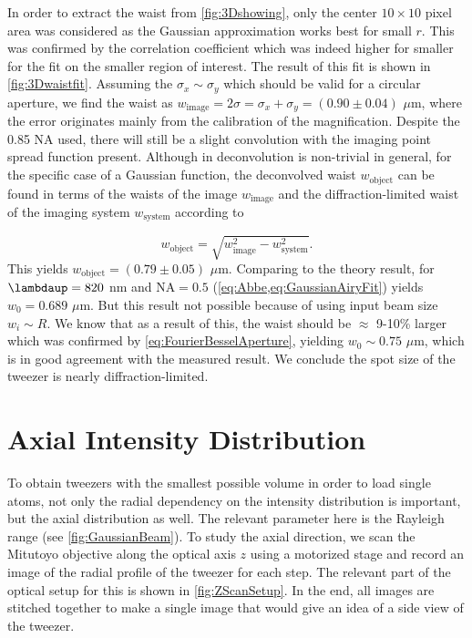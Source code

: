 In order to extract the waist from \cref{fig:3Dshowing}, only the center $10 \times 10$ pixel area was considered as the Gaussian approximation works best for small $r$. 
This was confirmed by the correlation coefficient which was indeed higher for smaller for the fit on the smaller region of interest. 
The result of this fit is shown in \cref{fig:3Dwaistfit}.
Assuming the $\sigma_x \sim \sigma_y$ which should be valid for a circular aperture, we find the waist as $w_{\text{image}} = 2\sigma = \sigma_x + \sigma_y = (0.90 \pm 0.04)$ $\mu$m, where the error originates mainly from the calibration of the magnification. 
Despite the 0.85 NA used, there will still be a slight convolution with the imaging point spread function present. 
Although in deconvolution is non-trivial in general, for the specific case of a Gaussian function, the deconvolved waist $w_{\text{object}}$ can be found in terms of the waists of the image $w_{\text{image}}$ and the diffraction-limited waist of the imaging system $w_{\text{system}}$ according to \cite{Knottnerus2018}

\begin{equation}\label{eq:Deconvolution}
    w_{\text{object}} = \sqrt{w_{\text{image}}^2-w_{\text{system}}^2}.
\end{equation}
This yields $w_{\text{object}} = (0.79 \pm 0.05)$ $\mu$m. 
Comparing to the theory result, for $\lambdaup = 820$ nm and $\text{NA} = 0.5$ (\cref{eq:Abbe,eq:GaussianAiryFit}) yields $w_0 = 0.689$ $\mu$m. 
But this result not possible because of using input beam size $w_i \sim R$. 
We know that as a result of this, the waist should be $\approx$ 9-10\% larger \cite{Chon2007,Sortais2007} which was confirmed by \cref{eq:FourierBesselAperture}, yielding $w_0 \sim 0.75$ $\mu$m, which is in good agreement with the measured result.
We conclude the spot size of the tweezer is nearly diffraction-limited.

\section{Axial Intensity Distribution}\label{sec:Tweezer3D}

To obtain tweezers with the smallest possible volume in order to load single atoms, not only the radial dependency on the intensity distribution is important, but the axial distribution as well.
The relevant parameter here is the Rayleigh range (see \cref{fig:GaussianBeam}).
To study the axial direction, we scan the Mitutoyo objective along the optical axis $z$ using a motorized stage and record an image of the radial profile of the tweezer for each step.
The relevant part of the optical setup for this is shown in \cref{fig:ZScanSetup}.
In the end, all images are stitched together to make a single image that would give an idea of a side view of the tweezer.

